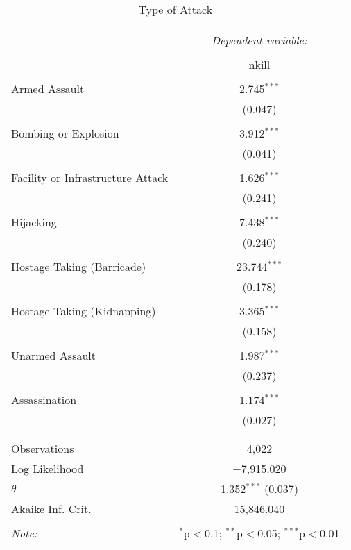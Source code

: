 
\begin{table}[!htbp] \centering 
  \caption{Type of Attack} 
  \label{} 
\begin{tabular}{@{\extracolsep{5pt}}lc} 
\\[-1.8ex]\hline 
\hline \\[-1.8ex] 
 & \multicolumn{1}{c}{\textit{Dependent variable:}} \\ 
\cline{2-2} 
\\[-1.8ex] & nkill \\ 
\hline \\[-1.8ex] 
 Armed Assault & 2.745$^{***}$ \\ 
  & (0.047) \\ 
  & \\ 
 Bombing or Explosion & 3.912$^{***}$ \\ 
  & (0.041) \\ 
  & \\ 
 Facility or Infrastructure Attack & 1.626$^{***}$ \\ 
  & (0.241) \\ 
  & \\ 
 Hijacking & 7.438$^{***}$ \\ 
  & (0.240) \\ 
  & \\ 
 Hostage Taking (Barricade) & 23.744$^{***}$ \\ 
  & (0.178) \\ 
  & \\ 
 Hostage Taking (Kidnapping) & 3.365$^{***}$ \\ 
  & (0.158) \\ 
  & \\ 
 Unarmed Assault & 1.987$^{***}$ \\ 
  & (0.237) \\ 
  & \\ 
 Assassination & 1.174$^{***}$ \\ 
  & (0.027) \\ 
  & \\ 
\hline \\[-1.8ex] 
Observations & 4,022 \\ 
Log Likelihood & $-$7,915.020 \\ 
$\theta$ & 1.352$^{***}$  (0.037) \\ 
Akaike Inf. Crit. & 15,846.040 \\ 
\hline 
\hline \\[-1.8ex] 
\textit{Note:}  & \multicolumn{1}{r}{$^{*}$p$<$0.1; $^{**}$p$<$0.05; $^{***}$p$<$0.01} \\ 
\end{tabular} 
\end{table} 
